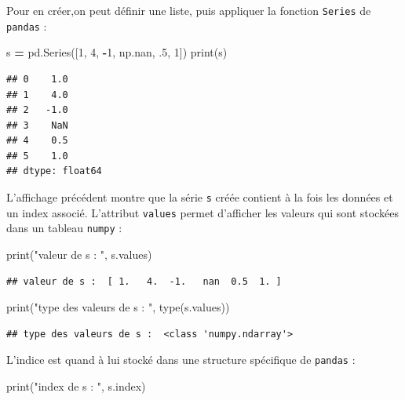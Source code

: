 \documentclass[
  12pt,
]{book}
\newenvironment{Shaded}{\begin{snugshade}}{\end{snugshade}}
\newcommand{\BuiltInTok}[1]{#1}
\newcommand{\DecValTok}[1]{\textcolor[rgb]{0.00,0.00,0.81}{#1}}
\newcommand{\FloatTok}[1]{\textcolor[rgb]{0.00,0.00,0.81}{#1}}
\newcommand{\NormalTok}[1]{#1}
\newcommand{\OperatorTok}[1]{\textcolor[rgb]{0.81,0.36,0.00}{\textbf{#1}}}
\newcommand{\StringTok}[1]{\textcolor[rgb]{0.31,0.60,0.02}{#1}}
\numberwithin{equation}{section}
\numberwithin{countremarque}{section}
\begin{document}
Pour en créer,on peut définir une liste, puis appliquer la fonction \texttt{Series} de \texttt{pandas} :

\begin{Shaded}
\begin{Highlighting}[]
\NormalTok{s }\OperatorTok{=}\NormalTok{ pd.Series([}\DecValTok{1}\NormalTok{, }\DecValTok{4}\NormalTok{, }\OperatorTok{{-}}\DecValTok{1}\NormalTok{, np.nan, }\FloatTok{.5}\NormalTok{, }\DecValTok{1}\NormalTok{])}
\BuiltInTok{print}\NormalTok{(s)}
\end{Highlighting}
\end{Shaded}

\begin{lstlisting}
## 0    1.0
## 1    4.0
## 2   -1.0
## 3    NaN
## 4    0.5
## 5    1.0
## dtype: float64
\end{lstlisting}

L'affichage précédent montre que la série \texttt{s} créée contient à la fois les données et un index associé. L'attribut \texttt{values} permet d'afficher les valeurs qui sont stockées dans un tableau \texttt{numpy} :

\begin{Shaded}
\begin{Highlighting}[]
\BuiltInTok{print}\NormalTok{(}\StringTok{"valeur de s : "}\NormalTok{, s.values)}
\end{Highlighting}
\end{Shaded}

\begin{lstlisting}
## valeur de s :  [ 1.   4.  -1.   nan  0.5  1. ]
\end{lstlisting}

\begin{Shaded}
\begin{Highlighting}[]
\BuiltInTok{print}\NormalTok{(}\StringTok{"type des valeurs de s : "}\NormalTok{, }\BuiltInTok{type}\NormalTok{(s.values))}
\end{Highlighting}
\end{Shaded}

\begin{lstlisting}
## type des valeurs de s :  <class 'numpy.ndarray'>
\end{lstlisting}

L'indice est quand à lui stocké dans une structure spécifique de \texttt{pandas} :

\begin{Shaded}
\begin{Highlighting}[]
\BuiltInTok{print}\NormalTok{(}\StringTok{"index de s : "}\NormalTok{, s.index)}
\end{Highlighting}
\end{Shaded}
\end{document}
